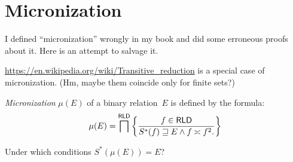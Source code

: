 \chapter{Micronization}

I defined ``micronization'' wrongly in my book and did some erroneous
proofs about it. Here is an attempt to salvage it.

\url{https://en.wikipedia.org/wiki/Transitive_reduction} is a special
case of micronization. (Hm, maybe them coincide only for finite sets?)

\begin{defn}
\emph{Micronization} $\mu(E)$ of a binary relation~$E$ is defined by
the formula:
\[
  \mu(E) = \bigsqcap^{\mathsf{RLD}} \left\{ \frac{f\in\mathsf{RLD}}{
    S^{\ast}(f)\sqsupseteq E \land f\asymp f^2.
  }\right\}
\]
\end{defn}

\begin{question}
Under which conditions $S^\ast(\mu(E)) = E$?
\end{question}
